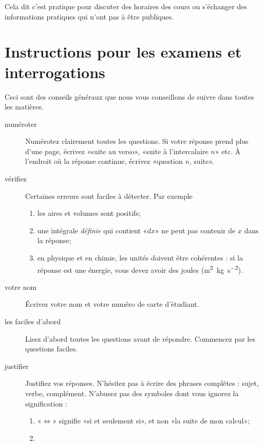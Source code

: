 {\tiny Cela dit c'est pratique pour discuter des horaires des cours ou s'échanger des informations pratiques qui n'ont pas à être publiques.}

\section{Instructions pour les examens et interrogations}

Ceci sont des conseils généraux que nous vous conseillons de suivre dans toutes les matières.
\begin{description}
    \item[numéroter] Numérotez clairement toutes les questions. Si votre réponse prend plus d'une page, écrivez «suite au verso», «suite à l'intercalaire \( n\)» etc. À l'endroit où la réponse continue, écrivez «question \( n\), suite».

    \item[vérifiez] Certaines erreurs sont faciles à détecter. Par exemple
        \begin{enumerate}
            \item
                les aires et volumes sont positifs;
            \item
                une intégrale \emph{définie} qui contient «\( dx\)» ne peut pas contenir de \( x\) dans la réponse;

            \item
                en physique et en chimie, les unités doivent être cohérentes : si la réponse est une énergie, vous devez avoir des joules (\unit{\square\metre\kilo\gram\per\square\second}).

        \end{enumerate}
    \item[votre nom] Écrivez votre nom et votre numéro de carte d'étudiant.

    \item[les faciles d'abord] Lisez d'abord toutes les questions avant de répondre. Commencez par les questions faciles.

    \item[justifier] Justifiez vos réponses. N'hésitez pas à écrire des phrases complètes : sujet, verbe, complément. N'abusez pas des symboles dont vous ignorez la signification :
        \begin{enumerate}
            \item
                «\( \Leftrightarrow\)» signifie «si et seulement si», et non «la suite de mon calcul»;
            \item


\end{enumerate}
\end{description}

